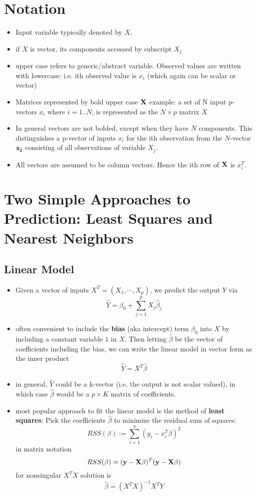 \section{Notation}
\begin{itemize}
  \item Input variable typically denoted by $X$. 
  \item if $X$ is vector, its components accessed by subscript $X_j$
  \item upper case refers to generic/abstract variable. Observed values are written with lowercase: i.e. ith observed value is $x_i$ (which again can be scalar or vector)
  \item Matrices represented by bold upper case $\bf X$
    \subitem example: a set of N input p-vectors $x_i$ where $i=1..N$, is represented as the $N\times p$ matrix $X$
  \item In general vectors are not bolded, except when they have $N$ components. This distinguishes a p-vector of inputs $x_i$ for the ith observation from the $N$-vector $\bf x_j$ consisting of all observations of variable $X_j$.
  \item All vectors are assumed to be column vectors. Hence the ith row of $\bf X$ is $x_i^T$.
\end{itemize}

\section{Two Simple Approaches to Prediction: Least Squares and Nearest Neighbors}
\subsection{Linear Model}
\begin{itemize}
  \item Given a vector of inputs $X^T = (X_1, \cdots, X_p)$, we predict the output $Y$ via
    $$ \hat{Y}  = \beta_0 + \sum_{j=1}^p X_j \hat{\beta}_j $$
  \item often convenient to include the {\bf bias} (aka intercept) term $\beta_0$  into $X$ by including a constant variable $1$ in $X$. Then letting $\hat{\beta}$ be the vector of coefficients including the bias, we can write the linear model in vector form as the inner product
    $$ \hat{Y} = X^T\hat{\beta} $$
  \item in general, $\hat{Y}$ could be a k-vector (i.e. the output is not scalar valued), in which case $\hat{\beta}$ would be a $p\times K$ matrix of coefficients.
  \item most popular approach to fit the linear model is the method of {\bf least squares}: Pick the coefficients $\hat{\beta}$ to minimize the residual sum of squares:
    $$ RSS(\beta) := \sum_{i=1}^n (y_i - x_i^T\beta)^2$$
    in matrix notation
    $$ RSS(\beta) = ({\bf y} - {\bf X}\beta)^T({\bf y} - {\bf X}\beta) $$
    \subitem for nonsingular $X^TX$ solution is
    $$ \hat{\beta} = \left(X^TX\right)^{-1} X^TY $$
\end{itemize}

